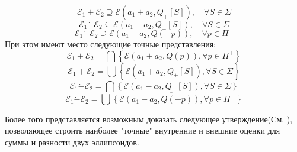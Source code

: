 \begin{theorem}
\begin{equation}
        \mathcal{E}_1 + \mathcal{E}_2 \supseteq \mathcal{E}(a_1 + a_2, Q_+[S]), \quad \forall S \in \Sigma
    \end{equation}
    \begin{equation}
        \mathcal{E}_1 \dot{-} \mathcal{E}_2 \subseteq \mathcal{E}(a_1 - a_2, Q_-[S]), \quad \forall S \in \Sigma
    \end{equation}
    \begin{equation}
        \mathcal{E}_1 \dot{-} \mathcal{E}_2 \supseteq \mathcal{E}(a_1 - a_2, Q(-p)), \quad \forall p \in \Pi^-
    \end{equation}
    При этом имеют место следующие точные представления:
    \begin{equation}
        \mathcal{E}_1 + \mathcal{E}_2 = \bigcap \left\{ \mathcal{E}(a_1 + a_2, Q(p)), \forall p \in \Pi^+ \right\}
    \end{equation}
    \begin{equation}
        \mathcal{E}_1 + \mathcal{E}_2 = \bigcup \left\{ \mathcal{E}(a_1 + a_2, Q_+[S]), \forall S \in \Sigma \right\}
    \end{equation}
    \begin{equation}
        \mathcal{E}_1 \dot{-} \mathcal{E}_2 = \bigcap \left\{ \mathcal{E}(a_1 - a_2, Q_-[S]), \forall S \in \Sigma \right\}
    \end{equation}
    \begin{equation}
        \mathcal{E}_1 \dot{-} \mathcal{E}_2 = \overline{ \bigcup \left\{ \mathcal{E}(a_1 - a_2, Q(-p)), \forall p \in \Pi^- \right\} }
    \end{equation}
\end{theorem}

Более того представляется возможным доказать следующее утверждение(См. \cite{ellips_calculus}), позволяющее
 строить наиболее "точные" внутренние и внешние оценки для суммы и разности двух эллипсоидов. 

